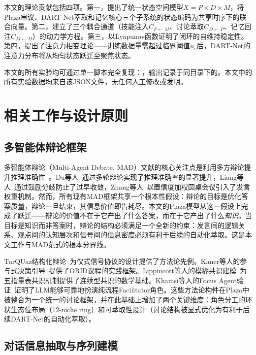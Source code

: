 \documentclass[12pt,a4paper]{ctexart}
\begin{document}
本文的理论贡献包括四项。第一，提出了统一状态空间模型$X = P \times D \times M$，将Plaza审议、DART-Net萃取和记忆核心三个子系统的状态编码为共享时序下的联合向量。第二，建立了三个耦合通道（技能注入$C_{P\leftarrow M}$、讨论萃取$C_{D\leftarrow P}$、记忆回注$C_{M\leftarrow D}$）的动力学方程。第三，以Lyapunov函数证明了闭环的自维持稳定性。第四，提出了注意力相变理论——训练数据量需超过临界阈值$n_c$后，DART-Net的注意力分布将从均匀状态跃迁至聚焦状态。

本文的所有实验均可通过单一脚本完全复现：，输出记录于同目录下的。本文中的所有实验数据均来自该JSON文件，无任何人工修改或发明。

\section{相关工作与设计原则}

\subsection{多智能体辩论框架}

多智能体辩论（Multi-Agent Debate, MAD）文献的核心关注点是利用多方辩论提升推理准确性~\cite{du2023improving,liang2023encouraging,zhang2024reconcile,xiong2023dubi}。Du等人~\cite{du2023improving}通过多轮辩论实现了推理准确率的显著提升，Liang等人~\cite{liang2023encouraging}通过鼓励分歧防止了过早收敛，Zhang等人~\cite{zhang2024reconcile}以置信度加权圆桌会议引入了发言权重机制。然而，所有现有MAD框架共享一个根本性假设：辩论的目标是优化答案质量，辩论一旦结束，其信息价值即告耗尽。本文的Plaza模型从这一假设上完成了跃迁——辩论的价值不在于它产出了什么答案，而在于它产出了什么\emph{知识}。当目标是知识而非答案时，辩论的结构必须满足一个全新的约束：发言间的逻辑关系、观点间的认知层次和信号间的信息密度必须有利于后续的自动化萃取。这是本文工作与MAD范式的根本分界线。

TurQUaz结构化辩论~\cite{gungor2025turquaz}为仪式信号协议的设计提供了方法论先例。Kaner等人的参与式决策引导~\cite{kaner2014facilitator}提供了ORID议程的实践框架。Lippincott等人的模糊共识建模~\cite{lippincott2025fuzzy}为五指量表共识机制提供了连续型共识的数学基础。Khamsi等人的Focus Agent验证~\cite{khamsi2024focus}证明了LLM能够可靠地扮演纯流程Facilitator角色。这些方法论构件在Plaza中被整合为一个统一的讨论框架，并在此基础上增加了两个关键维度：角色分工的环状生态位布局（12-niche ring）和可萃取性设计（讨论结构被显式优化为有利于后续DART-Net的自动化萃取）。

\subsection{对话信息抽取与序列建模}
\end{document}
